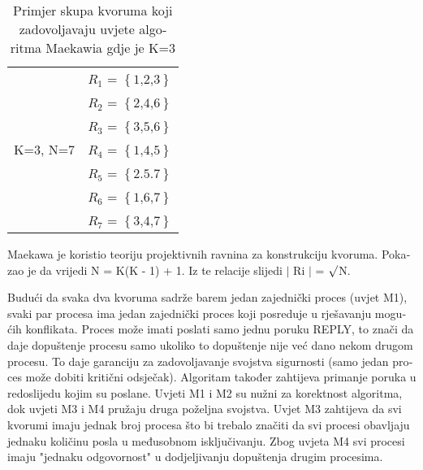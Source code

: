 \documentclass[12pt]{rectors}
\begin{document}
\begin{otherlanguage}{croatian}
\begin{table}[H]
	\centering
	\caption{Primjer skupa kvoruma koji zadovoljavaju uvjete algoritma Maekawia gdje je K=3}
	\label{my-label}
	\begin{tabular}{|l|l|}
		\hline
		& $R_1$ = $\left\{\text{1,2,3}\right\}$  \\
		& $R_2$ = $\left\{\text{2,4,6}\right\}$  \\
		& $R_3$ = $\left\{\text{3,5,6}\right\}$  \\
		K=3, N=7    & $R_4$ = $\left\{\text{1,4,5}\right\}$ \\ 
		& $R_5$ = $\left\{\text{2.5.7}\right\}$  \\
		& $R_6$ = $\left\{\text{1,6,7}\right\}$ \\
		& $R_7$ = $\left\{\text{3,4,7}\right\}$  \\\hline
	\end{tabular}
\end{table}


Maekawa je koristio teoriju projektivnih ravnina za konstrukciju kvoruma. Pokazao je da vrijedi N = K(K - 1) + 1. Iz te relacije slijedi $\mid$ Ri $\mid$ =  $\surd$N.

Budući da svaka dva kvoruma sadrže barem jedan zajednički proces (uvjet M1), svaki par procesa ima jedan zajednički proces koji posreduje u rješavanju mogućih konflikata. Proces može imati poslati samo jednu poruku REPLY, to znači da daje dopuštenje procesu samo ukoliko to dopuštenje nije već dano nekom drugom procesu. To daje garanciju za zadovoljavanje svojstva sigurnosti (samo jedan proces može dobiti kritični odsječak). Algoritam također zahtijeva primanje poruka u redoslijedu kojim su poslane.
Uvjeti M1 i M2 su nužni za korektnost algoritma, dok uvjeti M3 i M4 pružaju druga poželjna svojstva. Uvjet M3 zahtijeva da svi kvorumi imaju jednak broj procesa što bi trebalo značiti da svi procesi obavljaju jednaku količinu posla u međusobnom isključivanju. Zbog uvjeta M4 svi procesi imaju "jednaku odgovornost" u dodjeljivanju dopuštenja drugim procesima. 


\end{otherlanguage}
\end{document}
